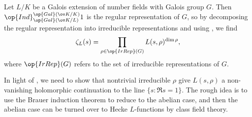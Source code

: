 \documentclass[../thesis.tex]{subfiles}
\begin{document}
\begin{example}
	Let $L/K$ be a Galois extension of number fields with Galois group $G$. Then $\op{Ind}_{\op{Gal}(\ov K/L)}^{\op{Gal}(\ov K/K)}1$ is the regular representation of $G$, so by decomposing the regular representation into irreducible representations and using , we find
	\[\zeta_L(s)=\prod_{\rho\in\op{IrRep}(G)}L(s,\rho)^{\dim\rho},\]
	where $\op{IrRep}(G)$ refers to the set of irreducible representations of $G$.
\end{example}
In light of , we need to show that nontrivial irreducible $\rho$ give $L(s,\rho)$ a non-vanishing holomorphic continuation to the line $\{s:\Re s=1\}$. The rough idea is to use the Brauer induction theorem to reduce to the abelian case, and then the abelian case can be turned over to Hecke $L$-functions by class field theory.
\end{document}
